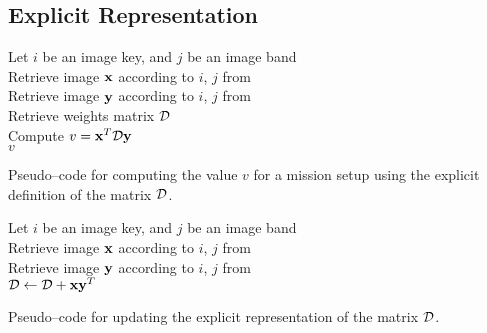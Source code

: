 \subsection{Explicit Representation} \label{subsect:meth:explicit}

\begin{algorithm}[H]
    \SetAlgoLined
         {
            Let $i$ be an image key, and $j$ be an image band \\
            Retrieve image $\boldsymbol{\mathbf{x}}$ according to $i$, $j$ from \usno \\
            Retrieve image $\boldsymbol{\mathbf{y}}$ according to $i$, $j$ from \panstarrs \\
            Retrieve weights matrix $\mathcal{D}$ \\
            Compute $v = \boldsymbol{\mathbf{x}}^T \mathcal{D} \boldsymbol{\mathbf{y}}$ \\
            \Return $v$
        }
    \caption{Pseudo--code for computing the value $v$ for a mission setup using the explicit definition of the matrix $\mathcal{D}$.}
    \label{pscode:compute-v:explicit}
\end{algorithm}

\begin{algorithm}[H]
    \SetAlgoLined
         {
            Let $i$ be an image key, and $j$ be an image band \\
            Retrieve image $\boldsymbol{\mathbf{x}}$ according to $i$, $j$ from \usno \\
            Retrieve image $\boldsymbol{\mathbf{y}}$ according to $i$, $j$ from \panstarrs \\
            $\mathcal{D} \gets \mathcal{D} + \boldsymbol{\mathbf{x}}\boldsymbol{\mathbf{y}}^T$ \\
        }
    \caption{Pseudo--code for updating the explicit representation of the matrix $\mathcal{D}$.}
    \label{pscode:update-d:explicit}
\end{algorithm}